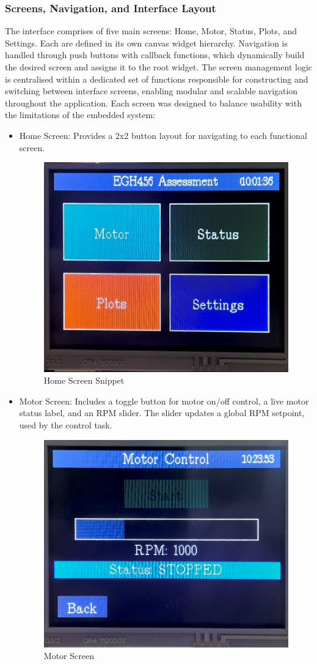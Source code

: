 \documentclass[a4paper, 11pt, titlepage]{article}
\begin{document}
\subsubsection{Screens, Navigation, and Interface Layout}
The interface comprises of five main screens: Home, Motor, Status, Plots, and Settings. Each are defined in its own canvas widget hierarchy. Navigation is handled through push buttons with callback functions, which dynamically build the desired screen and assigns it to the root widget. The screen management logic is centralised within a dedicated set of functions responsible for constructing and switching between interface screens, enabling modular and scalable navigation throughout the application. Each screen was designed to balance usability with the limitations of the embedded system:
\begin{itemize}
    \item Home Screen: Provides a 2x2 button layout for navigating to each functional screen.
    \begin{figure}[H]
    \centering
    \includegraphics[width=0.7\linewidth]{images/HomeScreen.png}
    \caption{Home Screen Snippet}
    \label{fig:home_screen}
\end{figure}
\item Motor Screen: Includes a toggle button for motor on/off control, a live motor status label, and an RPM slider. The slider updates a global RPM setpoint, used by the control task.
\begin{figure}[H]
    \centering
    \includegraphics[width=0.7\linewidth]{images/MotorControl.png}
    \caption{Motor Screen}
    \label{fig:motor_screen}
\end{figure}


\end{itemize}
\end{document}
